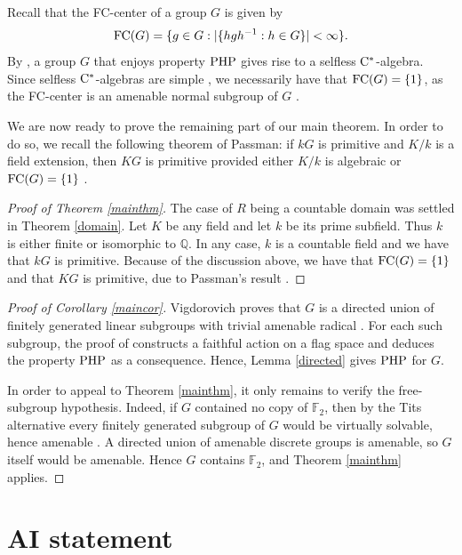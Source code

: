 \documentclass[11pt]{article}
\theoremstyle{definition}
\theoremstyle{remark}
\numberwithin{equation}{section}
\numberwithin{equation}{section}
\numberwithin{equation}{section}
\begin{document}
Recall that the FC-center of a group $G$ is given by
$$
 {\rm FC}(G)=\{g\in G:|\{hgh^{-1}:h\in G\}|<\infty\}.
$$
By \cite[Theorem 14]{Oz25}, a group $G$ that enjoys property ${\rm {PHP}}$ gives rise to a selfless $\rm C^*$-algebra. Since selfless $\rm C^*$-algebras are simple \cite[Theorem 3.1]{Ro25}, we necessarily have that ${\rm FC}(G)=\{1\}$, as the FC-center is an amenable normal subgroup of $G$ \cite[Theorem 1.3]{BKKO17}.

We are now ready to prove the remaining part of our main theorem. In order to do so, we recall the following theorem of Passman: if $kG$ is primitive and $K/k$ is a field extension, then $KG$ is primitive provided either $K/k$ is algebraic or ${\rm FC}(G)=\{1\}$ \cite[Theorem 2]{Pa73}. 

\begin{proof}[Proof of Theorem \ref{mainthm}]
The case of $R$ being a countable domain was settled in Theorem \ref{domain}. Let $K$ be any field and let $k$ be its prime subfield. Thus $k$ is either finite or isomorphic to $\mathbb Q$. In any case, $k$ is a countable field and we have that $kG$ is primitive. Because of the discussion above, we have that ${\rm FC}(G)=\{1\}$ and that $KG$ is primitive, due to Passman's result \cite[Theorem 2]{Pa73}. 
\end{proof}




\begin{proof}[Proof of Corollary \ref{maincor}]
Vigdorovich proves that $ G$ is a directed union of finitely generated linear subgroups with trivial amenable radical \cite[Lemma 5.3]{Vi26}. For each such subgroup, the proof of \cite[Theorem 1.2]{Vi26} constructs a faithful action on a flag space and deduces the property ${\rm {PHP}}$ as a consequence.  Hence, Lemma \ref{directed} gives ${\rm {PHP}}$ for $G$.

In order to appeal to Theorem \ref{mainthm}, it only remains to verify the free-subgroup hypothesis. Indeed, if $G$ contained no copy of $\mathbb F_2$, then by the Tits alternative every finitely generated subgroup of $G$ would be virtually solvable, hence amenable \cite{Ti72}.  A directed union of amenable discrete groups is amenable, so $ G$ itself would be amenable. Hence $G$ contains $\mathbb F_2$, and Theorem \ref{mainthm} applies.
\end{proof}



\section*{AI statement}
\end{document}
